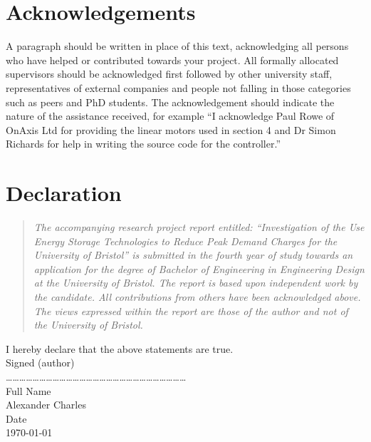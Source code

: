 \documentclass[fontsize=9.5pt]{extarticle}
\numberwithin{figure}{section} %
\newcommand{\AssignmentTitle}{Investigation of the Use Energy Storage Technologies to Reduce Peak Demand Charges for the University of Bristol}
\newcommand{\StudentNameA}{Alexander Charles}
\begin{document}

\section*{Acknowledgements}\label{acknowledgements}
A paragraph should be written in place of this text, acknowledging all persons who have helped or contributed towards your project. All formally allocated supervisors should be acknowledged first followed by other university staff, representatives of external companies and people not falling in those categories such as peers and PhD students. The acknowledgement should indicate the nature of the assistance received, for example “I acknowledge Paul Rowe of OnAxis Ltd for providing the linear motors used in section 4 and Dr Simon Richards for help in writing the source code for the controller.”

\section*{Declaration}\label{declartion}
\begin{quote}
\textit{The accompanying research project report entitled:  “\AssignmentTitle” is submitted in the fourth year of study towards an application for the degree of Bachelor of Engineering in Engineering Design at the University of Bristol. The report is based upon independent work by the candidate. All contributions from others have been acknowledged above. The views expressed within the report are those of the author and not of the University of Bristol.}
\end{quote}
I hereby declare that the above statements are true.
\\[2\baselineskip]
Signed (author)
\\[2\baselineskip]
 ………………………………………………………………………
\\[2\baselineskip]
Full Name
\\[2\baselineskip]
{\large \StudentNameA}
\\[2\baselineskip]
Date
\\[2\baselineskip]
{\large \today}

\newpage

\end{document}
